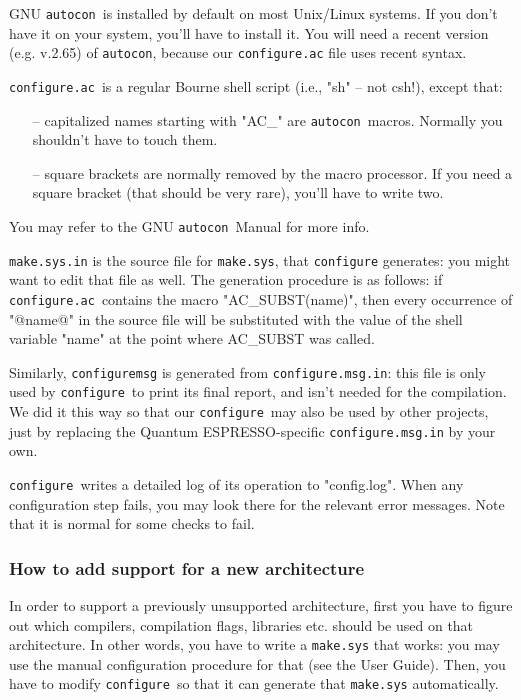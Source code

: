 \documentclass[12pt,a4paper]{article}
\def\qe{{\sc Quantum ESPRESSO}}
\def\configure{\texttt{configure}}
\def\configurac{\texttt{configure.ac}}
\def\autoconf{\texttt{autocon}}
\begin{document}
GNU \autoconf\ is installed by default on most Unix/Linux systems.  If
you don't have it on your system, you'll have to install it. You will
need a recent version (e.g. v.2.65) of \autoconf, because our \configurac
file uses recent syntax.

\configurac\ is a regular Bourne shell script (i.e., "sh" -- not csh!), 
except that:
\begin{itemize}
\item[--] capitalized names starting with "AC\_" are \autoconf\ macros.  Normally you shouldn't have to touch them.
\item[--] square brackets are normally removed by the macro processor.  If you need a square bracket (that should be very rare), you'll have to write two.
\end{itemize}

You may refer to the GNU \autoconf\ Manual for more info.

\texttt{make.sys.in} is the source file for \texttt{make.sys}, that \configure
generates: you might want to edit that file as well.  The generation
procedure is as follows: if \configurac\ contains the macro
"AC\_SUBST(name)", then every occurrence of "@name@" in the source
file will be substituted with the value of the shell variable "name"
at the point where AC\_SUBST was called.

Similarly, \configure\texttt{msg} is generated from \configure\texttt{.msg.in}: this
file is only used by \configure\ to print its final report, and isn't
needed for the compilation.  We did it this way so that our
\configure\ may also be used by other projects, just by replacing the
\qe-specific \configure\texttt{.msg.in} by your own.

\configure\ writes a detailed log of its operation to "config.log".
When any configuration step fails, you may look there for the relevant
error messages.  Note that it is normal for some checks to fail.

\subsubsection{How to add support for a new architecture}

In order to support a previously unsupported architecture, first you
have to figure out which compilers, compilation flags, libraries
etc. should be used on that architecture.
In other words, you have to write a \texttt{make.sys} that works: you may use
the manual configuration procedure for that (see the 
User Guide).  Then, you have to modify \configure\ so that it can
generate that \texttt{make.sys} automatically.
\end{document}

